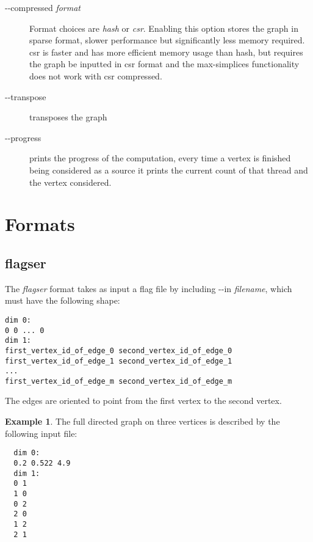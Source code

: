\documentclass{amsart}
\theoremstyle{definition}
\newtheorem*{example*}{Example}
\begin{document}
\begin{description}
  \item [-{}-compressed \textit{format}] Format choices are \emph{hash} or \emph{csr}. Enabling this option stores the graph in sparse format, slower performance but significantly less memory required. csr is faster and has more efficient memory usage than hash, but requires the graph be inputted in csr format and the max-simplices functionality does not work with csr compressed.
  \item [-{}-transpose] transposes the graph
  \item [-{}-progress] prints the progress of the computation, every time a vertex is finished being considered as a source it prints the current count of that thread and the vertex considered.

\end{description}

\vspace{1em}

\section{Formats}
\subsection{flagser}
\noindent
The \textit{flagser} format takes as input a flag file by including -{}-in \textit{filename}, which must have the following shape:

\vspace{.5em}
\begin{verbatim}
dim 0:
0 0 ... 0
dim 1:
first_vertex_id_of_edge_0 second_vertex_id_of_edge_0
first_vertex_id_of_edge_1 second_vertex_id_of_edge_1
...
first_vertex_id_of_edge_m second_vertex_id_of_edge_m
\end{verbatim}
\vspace{.5em}

\noindent
The edges are oriented to point from the first vertex to the second vertex.

\begin{example*}
  The full directed graph on three vertices is described by the
  following input file:

  \vspace{.5em}
  \begin{verbatim}
  dim 0:
  0.2 0.522 4.9
  dim 1:
  0 1
  1 0
  0 2
  2 0
  1 2
  2 1
  \end{verbatim}
\end{example*}
\end{document}
